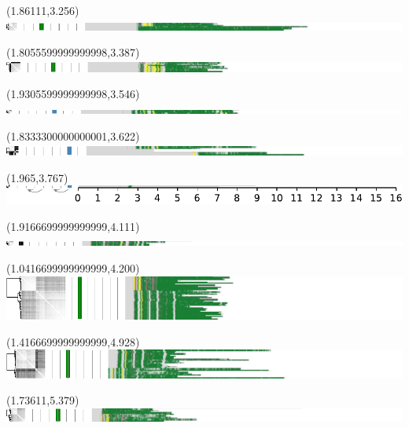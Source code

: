 \documentclass{article}
\begin{document}
\begin{textblock}{13}(1.86111,3.256)\includegraphics{./Figure_S5/chr8-HG003.pdf}\end{textblock}
\begin{textblock}{13}(1.8055599999999998,3.387)\includegraphics{./Figure_S5/chr8-HG004.pdf}\end{textblock}
\begin{textblock}{13}(1.9305599999999998,3.546)\includegraphics{./Figure_S5/chr8-HG005.pdf}\end{textblock}
\begin{textblock}{13}(1.8333300000000001,3.622)\includegraphics{./Figure_S5/chr8-HG006.pdf}\end{textblock}
\begin{textblock}{13}(1.965,3.767)\includegraphics{./Figure_S5/chr8-HG007.pdf}\end{textblock}
\begin{textblock}{13}(1.9166699999999999,4.111)\includegraphics{./Figure_S5/chr11-HG001.pdf}\end{textblock}
\begin{textblock}{13}(1.0416699999999999,4.200)\includegraphics{./Figure_S5/chr11-HG002.pdf}\end{textblock}
\begin{textblock}{13}(1.4166699999999999,4.928)\includegraphics{./Figure_S5/chr11-HG003.pdf}\end{textblock}
\begin{textblock}{13}(1.73611,5.379)\includegraphics{./Figure_S5/chr11-HG004.pdf}\end{textblock}
\end{document}
